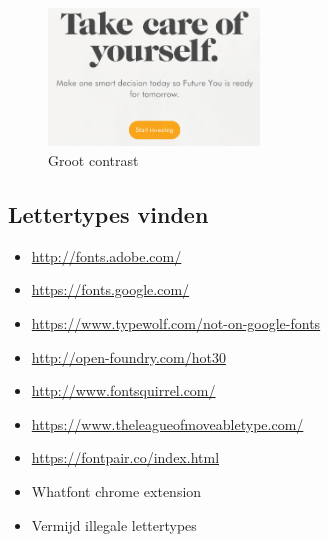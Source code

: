 \documentclass{article}
\begin{document}
\begin{figure}[H]
    \centering
    \includegraphics[width=0.5\textwidth]{img/Screenshot_20200224_101129.png}
    \caption{Groot contrast}
\end{figure}

\subsection{Lettertypes vinden}
\begin{itemize}
    \item \url{http://fonts.adobe.com/}
    \item \url{https://fonts.google.com/}
    \item \url{https://www.typewolf.com/not-on-google-fonts}
    \item \url{http://open-foundry.com/hot30}
    \item \url{http://www.fontsquirrel.com/}
    \item \url{https://www.theleagueofmoveabletype.com/}
    \item \url{https://fontpair.co/index.html}
    \item Whatfont chrome extension
    \item Vermijd illegale lettertypes
\end{itemize}
\end{document}
